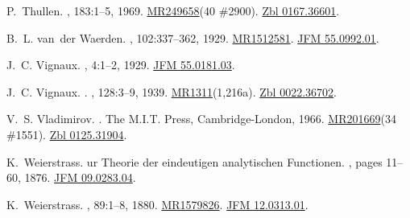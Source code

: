 \documentclass[11pt,a4paper, final, twoside]{article}
\numberwithin{equation}{section}
\begin{document}
\begin{appendices}
\begin{thebibliography}{100}
P.~Thullen.
, 183:1--5, 1969.
\newblock \href{http://www.ams.org/mathscinet-getitem?mr=249658}{MR249658}(40
  \#2900). \href{http://zbmath.org/?q=an:0167.36601}{Zbl 0167.36601}.

B.~L. van~der Waerden.
, 102:337--362, 1929.
\newblock \href{http://www.ams.org/mathscinet-getitem?mr=1512581}{MR1512581}.
  \href{http://zbmath.org/?q=an:55.0992.01}{JFM 55.0992.01}.

J.~C. Vignaux.
, 4:1--2,
  1929.
\newblock \href{http://zbmath.org/?q=an:55.0181.03}{JFM 55.0181.03}.

J.~C. Vignaux.
.
, 128:3--9, 1939.
\newblock \href{http://www.ams.org/mathscinet-getitem?mr=1311}{MR1311}(1,216a).
  \href{http://zbmath.org/?q=an:0022.36702}{Zbl 0022.36702}.

V.~S. Vladimirov.
.
\newblock The M.I.T. Press, Cambridge-London, 1966.
\newblock \href{http://www.ams.org/mathscinet-getitem?mr=201669}{MR201669}(34
  \#1551). \href{http://zbmath.org/?q=an:0125.31904}{Zbl 0125.31904}.

K.~Weierstrass.
ur {T}heorie der eindeutigen analytischen {F}unctionen.
, pages 11--60, 1876.
\newblock \href{http://zbmath.org/?q=an:09.0283.04}{JFM 09.0283.04}.

K.~Weierstrass.
, 89:1--8,
  1880.
\newblock \href{http://www.ams.org/mathscinet-getitem?mr=1579826}{MR1579826}.
  \href{http://zbmath.org/?q=an:12.0313.01}{JFM 12.0313.01}.


\end{thebibliography}
\end{appendices}
\end{document}
